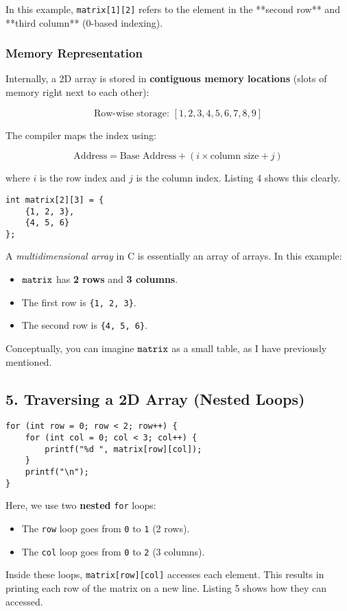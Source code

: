 \documentclass[a4paper,12pt]{article}
\begin{document}
In this example, \texttt{matrix[1][2]} refers to the element in the **second row** and **third column** (0-based indexing).

\subsubsection{Memory Representation}
Internally, a 2D array is stored in \textbf{contiguous memory locations} (slots of memory right next to each other):

\[
\text{Row-wise storage: } [1, 2, 3, 4, 5, 6, 7, 8, 9]
\]

The compiler maps the index using:

\[
\text{Address} = \text{Base Address} + (i \times \text{column size} + j)
\]

where \( i \) is the row index and \( j \) is the column index. Listing 4 shows this clearly.

\begin{lstlisting}[caption=Row and column indices]
int matrix[2][3] = {
    {1, 2, 3},
    {4, 5, 6}
};
\end{lstlisting}

A \emph{multidimensional array} in C is essentially an array of arrays. In this example:

\begin{itemize}
  \item \(\verb|matrix|\) has \textbf{2 rows} and \textbf{3 columns}.
  \item The first row is \verb|{1, 2, 3}|.
  \item The second row is \verb|{4, 5, 6}|.
\end{itemize}

Conceptually, you can imagine \(\verb|matrix|\) as a small table, as I have previously mentioned.

\subsection{5. Traversing a 2D Array (Nested Loops)}

\begin{lstlisting}[caption=Matrix Traversal]
for (int row = 0; row < 2; row++) {
    for (int col = 0; col < 3; col++) {
        printf("%d ", matrix[row][col]);
    }
    printf("\n");
}
\end{lstlisting}

Here, we use two \textbf{nested} \texttt{for} loops:
\begin{itemize}
  \item The \texttt{row} loop goes from \verb|0| to \verb|1| (2 rows).
  \item The \texttt{col} loop goes from \verb|0| to \verb|2| (3 columns).
\end{itemize}
Inside these loops, \verb|matrix[row][col]| accesses each element. This results in printing each row of the matrix on a new line. Listing 5 shows how they can accessed.  
\end{document}
